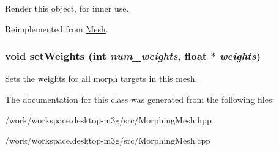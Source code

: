 Render this object, for inner use. 

Reimplemented from \hyperlink{classm3g_1_1Mesh_8babc8a79b78615da51161e94029eea9}{Mesh}.\hypertarget{classm3g_1_1MorphingMesh_b97015e8aeed76a33582eb11d06e322b}{
\subsubsection[{setWeights}]{\setlength{\rightskip}{0pt plus 5cm}void setWeights (int {\em num\_\-weights}, \/  float $\ast$ {\em weights})}}
\label{classm3g_1_1MorphingMesh_b97015e8aeed76a33582eb11d06e322b}


Sets the weights for all morph targets in this mesh. 

The documentation for this class was generated from the following files:\begin{CompactItemize}
\item 
/work/workspace.desktop-m3g/src/MorphingMesh.hpp\item 
/work/workspace.desktop-m3g/src/MorphingMesh.cpp\end{CompactItemize}
